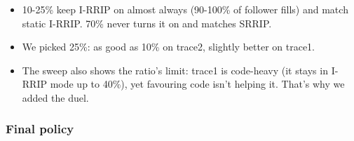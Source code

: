 \documentclass[10pt]{article}
\providecommand{\tightlist}{%
  \setlength{\itemsep}{2pt}\setlength{\parskip}{0pt}}
\begin{document}
\begin{itemize}
\tightlist
\item 10-25\% keep I-RRIP on almost always (90-100\% of follower fills) and match static I-RRIP. 70\% never turns it on and matches SRRIP.
\item We picked 25\%: as good as 10\% on trace2, slightly better on trace1.
\item The sweep also shows the ratio's limit: trace1 is code-heavy (it stays in I-RRIP mode up to 40\%), yet favouring code isn't helping it. That's why we added the duel.
\end{itemize}

\subsubsection{Final policy}
\end{document}
